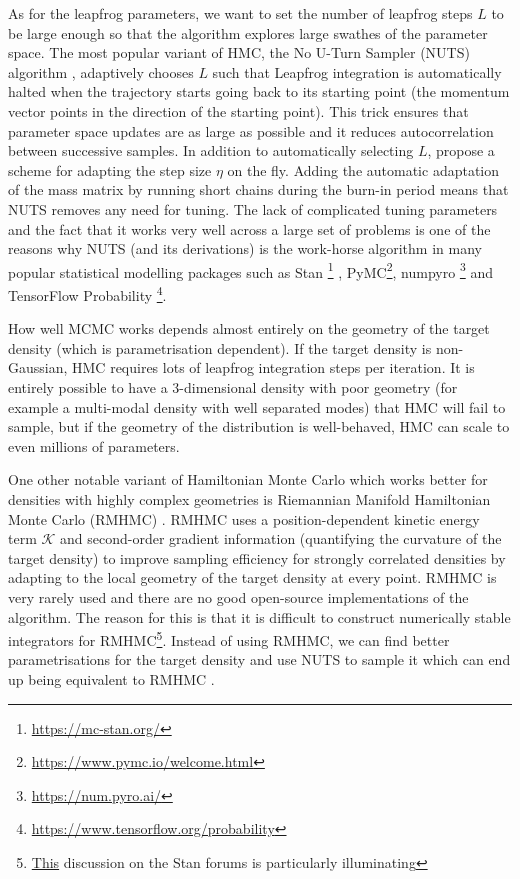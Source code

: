 \documentclass[12pt,dvipsnames]{report}
\newcommand{\ssf}[1]{\textsf{#1}}
\begin{document}
As for the leapfrog parameters, we want to set the number of leapfrog steps $L$ to be 
large enough so that the algorithm explores large swathes of the parameter space.
The most popular variant of HMC, the No U-Turn Sampler (NUTS) algorithm 
\citep{arXiv:1111.4246}, adaptively chooses $L$ such that Leapfrog integration is 
automatically halted when the trajectory starts going back to its starting point (the
momentum vector points in the direction of the starting point).
This trick ensures that parameter space updates are as large as possible and it 
reduces autocorrelation between successive samples.
In addition to automatically selecting $L$, \citet{arXiv:1111.4246} propose a 
scheme for adapting the step size $\eta$ on the fly. Adding the automatic adaptation
of the mass matrix by running short chains during the burn-in period means that 
NUTS removes any need for tuning. The lack of complicated tuning parameters and 
the fact that it works very well across a large set of problems is one of the 
reasons why NUTS (and its derivations) is the work-horse algorithm 
in many popular statistical modelling packages such as \ssf{Stan}
\footnote{\url{https://mc-stan.org/}} \citep{2017JSS....76....1C}, 
\ssf{PyMC}\footnote{\url{https://www.pymc.io/welcome.html}}, \ssf{numpyro}
\footnote{\url{https://num.pyro.ai/}} and \ssf{TensorFlow Probability}
\footnote{\url{https://www.tensorflow.org/probability}}. 

How well MCMC works depends almost entirely on the geometry of the target density
(which is parametrisation dependent). If the target density is non-Gaussian,
HMC requires lots of leapfrog integration steps per iteration. It is entirely 
possible to have a 3-dimensional density with poor geometry (for example 
a multi-modal density with well separated modes) that HMC will 
fail to sample, but if the geometry of the distribution is well-behaved, HMC can scale to 
even millions of parameters.


One other notable variant of Hamiltonian Monte Carlo which works better for 
densities with highly complex geometries is 
Riemannian Manifold Hamiltonian Monte Carlo (RMHMC) \citep{girolami2011}.
RMHMC uses a position-dependent kinetic energy term $\mathcal{K}$ and second-order 
gradient information (quantifying the curvature of the target density) to improve 
sampling efficiency for strongly correlated densities by adapting to the local geometry 
of the target density at every point. RMHMC is very rarely used and there are no 
good open-source implementations of the algorithm. The reason for this is that 
it is  difficult to construct numerically stable integrators for RMHMC\footnote{
    \href{https://discourse.mc-stan.org/t/riemann-manifold-hmc-in-stan/19466/5}{This}
discussion on the \ssf{Stan} forums is particularly illuminating}.
Instead of using RMHMC, we can find better parametrisations for the target density
and use NUTS to sample it which can end up being equivalent to 
RMHMC \citep{arXiv:1910.09407}.
\end{document}
